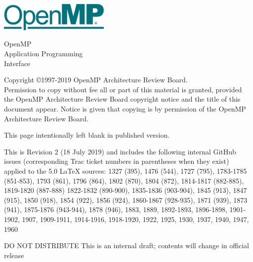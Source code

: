 
  \begin{titlepage}
    \begin{flushleft}
     \hspace{-6em} \includegraphics[width=0.4\textwidth]{openmp-logo.png}
    \end{flushleft}

    \begin{adjustwidth}{-0.75in}{0in}
    \begin{center}
      \Huge
      \textsf{OpenMP\\Application Programming\\Interface}

      \vspace{0.5in}\textsf{    }\vspace{-0.7in}
      \normalsize

      \vspace{1.0in}

      \textbf{\ompversion{}}
    \end{center}
    \end{adjustwidth}

    \vspace{3.0in}

\begin{adjustwidth}{0pt}{1em}\setlength{\parskip}{0.25\baselineskip}%
Copyright \copyright 1997-2019 OpenMP Architecture Review Board.\\
Permission to copy without fee all or part of this material is granted,
provided the OpenMP Architecture Review Board copyright notice and
the title of this document appear. Notice is given that copying is by
permission of the OpenMP Architecture Review Board.\end{adjustwidth}

  \end{titlepage}


\clearpage
\thispagestyle{empty}
\phantom{a}
This page intentionally left blank in published version.

This is Revision 2 (18 July 2019) and includes the following internal 
GitHub issues (corresponding Trac ticket numbers in parentheses when
they exist) applied to the 5.0 LaTeX sources: 1327 (395), 1476 (544), 
1727 (795), 1783-1785 (851-853), 1793 (861), 1796 (864), 1802 (870), 
1804 (872), 1814-1817 (882-885), 1819-1820 (887-888) 1822-1832 (890-900), 
1835-1836 (903-904), 1845 (913), 1847 (915), 1850 (918), 
1854 (922), 1856 (924), 1860-1867 (928-935), 1871 (939), 1873 (941), 
1875-1876 (943-944), 1878 (946), 1883, 1889, 1892-1893, 1896-1898, 
1901-1902, 1907, 1909-1911, 1914-1916, 1918-1920, 1922, 1925, 1930, 
1937, 1940, 1947, 1960

DO NOT DISTRIBUTE
This is an internal draft; contents will change in official release

\vfill

